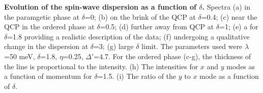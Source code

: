 \label{fig:fig1} {\bf Evolution of the spin-wave dispersion as a function of $\delta$.} Spectra (a) in the paramgetic phase at $\delta$=0; (b) on the brink of the QCP at $\delta$=0.4; (c) near the QCP in the ordered phase at $\delta$=0.5; (d) further away from QCP at $\delta$=1; (e) a for $\delta$=1.8 providing a realistic description of the data; (f) undergoing a qualitative change in the dispersion at $\delta$=3; (g) large $\delta$ limit. The parameters used were $\lambda$=50 meV, $\delta$=1.8, $\eta$=0.25, $\Delta'$=4.7. For the ordered phase (c-g), the thickness of the line is proportional to the intensity. (h) The intensities for $x$ and $y$ modes as a function of momentum for $\delta$=1.5. (i) The ratio of the $y$ to $x$ mode as a function of $\delta$.